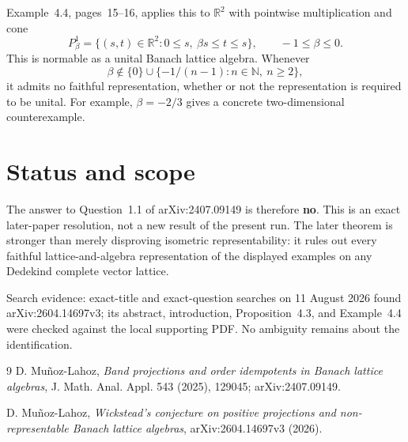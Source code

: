 \documentclass[11pt]{article}
\newcommand{\R}{\mathbb R}
\begin{document}
Example~4.4, pages~15--16, applies this to $\R^2$ with pointwise
multiplication and cone
\[
 P^1_\beta=\{(s,t)\in\R^2:0\le s,\ \beta s\le t\le s\},
 \qquad -1\le\beta\le0.
\]
This is normable as a unital Banach lattice algebra.  Whenever
\[
 \beta\notin\{0\}\cup
 \{-1/(n-1):n\in\mathbb N,\ n\ge2\},
\]
it admits no faithful representation, whether or not the representation is
required to be unital.  For example, $\beta=-2/3$ gives a concrete
two-dimensional counterexample.

\section*{Status and scope}

The answer to Question~1.1 of arXiv:2407.09149 is therefore \textbf{no}.
This is an exact later-paper resolution, not a new result of the present run.
The later theorem is stronger than merely disproving isometric
representability: it rules out every faithful lattice-and-algebra
representation of the displayed examples on any Dedekind complete vector
lattice.

Search evidence: exact-title and exact-question searches on 11 August 2026
found arXiv:2604.14697v3; its abstract, introduction, Proposition~4.3, and
Example~4.4 were checked against the local supporting PDF.  No ambiguity
remains about the identification.

\begin{thebibliography}{9}
D. Mu\~noz-Lahoz,
\emph{Band projections and order idempotents in Banach lattice algebras},
J. Math. Anal. Appl. 543 (2025), 129045; arXiv:2407.09149.

D. Mu\~noz-Lahoz,
\emph{Wickstead's conjecture on positive projections and non-representable
Banach lattice algebras}, arXiv:2604.14697v3 (2026).
\end{thebibliography}
\end{document}

